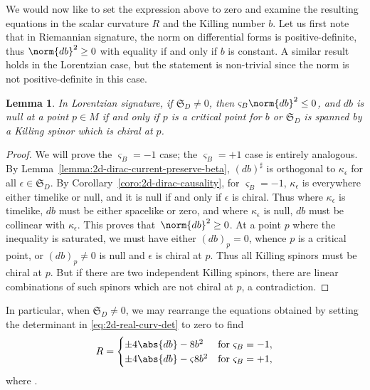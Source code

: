 \documentclass[10pt,a4paper]{amsart}
\numberwithin{equation}{section}
\newtheorem{Lemma}[Theorem]{Lemma}
\newcommand{\fS}{\mathfrak{S}}
\newcommand{\1}{\mathbbm{1}}
\begin{document}
We would now like to set the expression above to zero and examine the resulting equations in the scalar curvature $R$ and the Killing number $b$. Let us first note that in Riemannian signature, the norm on differential forms is positive-definite, thus $\norm{db}^2\geq 0$ with equality if and only if $b$ is constant. A similar result holds in the Lorentzian case, but the statement is non-trivial since the norm is not positive-definite in this case.

\begin{Lemma}
	In Lorentzian signature, if $\fS_D\neq 0$, then $\varsigma_B\norm{db}^2\leq 0$, and $db$ is null at a point $p\in M$ if and only if $p$ is a critical point for $b$ or $\fS_D$ is spanned by a Killing spinor which is chiral at $p$.
\end{Lemma}

\begin{proof}
	We will prove the $\varsigma_B=-1$ case; the $\varsigma_B=+1$ case is entirely analogous. By Lemma~\ref{lemma:2d-dirac-current-preserve-beta}, $(db)^\sharp$ is orthogonal to $\kappa_\epsilon$ for all $\epsilon\in\fS_D$. By Corollary~\ref{coro:2d-dirac-causality}, for $\varsigma_B=-1$, $\kappa_\epsilon$ is everywhere either timelike or null, and it is null if and only if $\epsilon$ is chiral. Thus where $\kappa_\epsilon$ is timelike, $db$ must be either spacelike or zero, and where $\kappa_\epsilon$ is null, $db$ must be collinear with $\kappa_\epsilon$. This proves that~$\norm{db}^2\geq 0$. At a point $p$ where the inequality is saturated, we must have either $(db)_p=0$, whence $p$ is a critical point, or $(db)_p\neq 0$ is null and $\epsilon$ is chiral at $p$. Thus all Killing spinors must be chiral at $p$. But if there are two independent Killing spinors, there are linear combinations of such spinors which are not chiral at $p$, a contradiction.
\end{proof}

In particular, when $\fS_D\neq 0$, we may rearrange the equations obtained by setting the determinant in \eqref{eq:2d-real-curv-det} to zero to find
\begin{equation}\label{eq:2d-scalar-curv-formula}
	R =
		\begin{cases}
			\pm 4\abs{db} - 8b^2	& \text{for } \varsigma_B=-1,	\\
			\pm 4\abs{db} - \varsigma 8b^2		& \text{for } \varsigma_B=+1,
		\end{cases}
\end{equation}
where .
\end{document}
